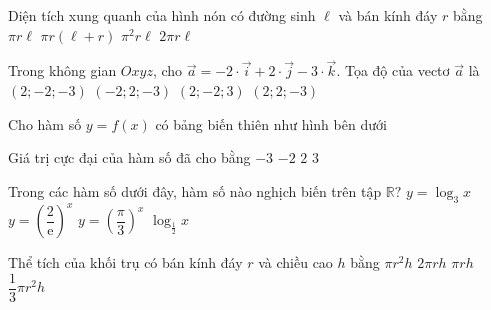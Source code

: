 \begin{ex}%
	Diện tích xung quanh của hình nón có đường sinh $\ell$ và bán kính đáy $r$ bằng	
	\choice
	{\True $\pi r\ell$}
	{$\pi r(\ell+r)$}
	{$\pi^2r\ell$}
	{$2\pi r\ell$}
\end{ex}

\begin{ex}%
	Trong không gian $Oxyz$, cho $\overrightarrow{a}=-2\cdot \overrightarrow{i}+2\cdot \overrightarrow{j}-3\cdot\overrightarrow{k}$. Tọa độ của vectơ $\overrightarrow{a}$ là	
	\choice
	{$(2;-2;-3)$}
	{\True $(-2;2;-3)$}
	{$(2;-2;3)$}
	{$(2;2;-3)$}
\end{ex}

\begin{ex}%
	Cho hàm số $y=f(x)$ có bảng biến thiên như hình bên dưới
	\begin{center}
	\end{center}
	Giá trị cực đại của hàm số đã cho bằng
	\choice
	{$-3$}
	{$-2$}
	{\True $2$}
	{$3$}
\end{ex}

\begin{ex}%
	Trong các hàm số dưới đây, hàm số nào nghịch biến trên tập $\mathbb{R}?$	
	\choice
	{$y=\log_3x$}
	{\True $y=\left(\dfrac{2}{\mathrm{e}}\right)^x$}
	{$y=\left(\dfrac{\pi}{3}\right)^x$}
	{$\log_{\frac{1}{2}}x$}
\end{ex}

\begin{ex}%
	Thể tích của khối trụ có bán kính đáy $r$ và chiều cao $h$ bằng	
	\choice
	{\True $\pi r^2 h$}
	{$2\pi rh$}
	{$\pi rh$}
	{ $\dfrac{1}{3}\pi r^2 h$}
\end{ex}

